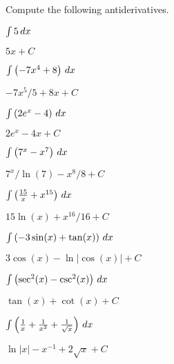 \begin{exercises}
\noindent Compute the following antiderivatives.
\begin{multicols}{2}
\begin{exercise}
$\int 5\, d x$
\begin{answer}
$5x+C$
\end{answer}
\end{exercise}

\begin{exercise}
$\int \left(-7x^4+8\right)\, d x$
\begin{answer}
$-7x^5/5 +8x + C$
\end{answer}
\end{exercise}

\begin{exercise}
$\int \left(2e^x -4\right)\, d x$
\begin{answer}
$2e^x -4x + C$
\end{answer}
\end{exercise}

\begin{exercise}
$\int \left(7^x - x^7\right)\, d x$
\begin{answer}
$7^x/\ln(7) - x^8/8 +C$
\end{answer}
\end{exercise}


\begin{exercise}
$\int \left(\frac{15}{x}+x^{15}\right)\, d x$
\begin{answer}
$15\ln(x) + x^{16}/16 + C$
\end{answer}
\end{exercise}


\begin{exercise}
$\int \left(-3\sin(x) + \tan(x)\right)\, d x$
\begin{answer}
$3\cos(x) -\ln|\cos(x)|+C$
\end{answer}
\end{exercise}

\begin{exercise}
$\int \left(\sec^2(x) -\csc^2(x)\right) \, d x$
\begin{answer}
$\tan(x) + \cot(x) + C$
\end{answer}
\end{exercise}


\begin{exercise}
$\int\left(\frac{1}{x} + \frac{1}{x^2} + \frac{1}{\sqrt{x}}\right)\, d x$
\begin{answer}
$\ln|x|  - x^{-1} + 2\sqrt{x} +C$ 
\end{answer}
\end{exercise}


\end{multicols}
\end{exercises}

